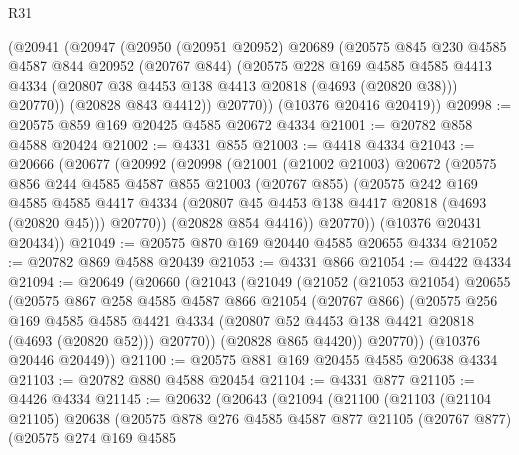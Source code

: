 \begin{lexlean}{R31}
\begin{coremodule}
      (@20941
        (@20947
          (@20950
            (@20951 @20952)
            @20689
            (@20575
              @845
              @230
              @4585
              @4587
              @844
              @20952
              (@20767 @844)
              (@20575
                @228
                @169
                @4585
                @4585
                @4413
                @4334
                (@20807 @38 @4453 @138 @4413 @20818 (@4693 (@20820 @38)))
                @20770))
            (@20828 @843 @4412))
          @20770))
      (@10376 @20416 @20419))
@20998 := @20575 @859 @169 @20425 @4585 @20672 @4334
@21001 := @20782 @858 @4588 @20424
@21002 := @4331 @855
@21003 := @4418 @4334
@21043 := @20666
    (@20677
      (@20992
        (@20998
          (@21001
            (@21002 @21003)
            @20672
            (@20575
              @856
              @244
              @4585
              @4587
              @855
              @21003
              (@20767 @855)
              (@20575
                @242
                @169
                @4585
                @4585
                @4417
                @4334
                (@20807 @45 @4453 @138 @4417 @20818 (@4693 (@20820 @45)))
                @20770))
            (@20828 @854 @4416))
          @20770))
      (@10376 @20431 @20434))
@21049 := @20575 @870 @169 @20440 @4585 @20655 @4334
@21052 := @20782 @869 @4588 @20439
@21053 := @4331 @866
@21054 := @4422 @4334
@21094 := @20649
    (@20660
      (@21043
        (@21049
          (@21052
            (@21053 @21054)
            @20655
            (@20575
              @867
              @258
              @4585
              @4587
              @866
              @21054
              (@20767 @866)
              (@20575
                @256
                @169
                @4585
                @4585
                @4421
                @4334
                (@20807 @52 @4453 @138 @4421 @20818 (@4693 (@20820 @52)))
                @20770))
            (@20828 @865 @4420))
          @20770))
      (@10376 @20446 @20449))
@21100 := @20575 @881 @169 @20455 @4585 @20638 @4334
@21103 := @20782 @880 @4588 @20454
@21104 := @4331 @877
@21105 := @4426 @4334
@21145 := @20632
    (@20643
      (@21094
        (@21100
          (@21103
            (@21104 @21105)
            @20638
            (@20575
              @878
              @276
              @4585
              @4587
              @877
              @21105
              (@20767 @877)
              (@20575
                @274
                @169
                @4585

\end{coremodule}
\end{lexlean}
